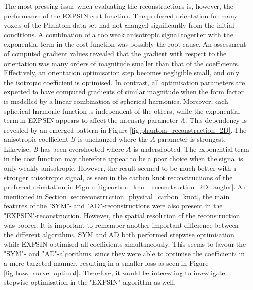 The most pressing issue when evaluating the reconstructions is, however, the performance of the EXPSIN cost function.
The preferred orientation for many voxels of the Phantom data set had not changed significantly from the initial conditions.
A combination of a too weak anisotropic signal together with the exponential term in the cost function was possibly the root cause.
An assessment of computed gradient values revealed that the gradient with respect to the orientation was many orders of magnitude smaller than that of the coefficients.
Effectively, an orientation optimisation step becomes negligible small, and only the isotropic coefficient is optimised.
In contrast, all optimisation parameters are expected to have computed gradients of similar magnitude when the form factor is modelled by a linear combination of spherical harmonics.
Moreover, each spherical harmonic function is independent of the others, while the exponential term in EXPSIN appears to affect the intensity parameter $A$.
This dependency is revealed by an emerged pattern in Figure \ref{fig:phantom_reconstruction_2D}. The anisotropic coefficient $B$ is unchanged where the $A$-parameter is strongest. Likewise, $B$ has been overshooted where $A$ is undershooted.
The exponential term in the cost function may therefore appear to be a poor choice when the signal is only weakly anisotropic.
However, the result seemed to be much better with a stronger anisotropic signal, as seen in the carbon knot reconstructions of the preferred orientation in Figure \ref{fig:carbon_knot_reconstruction_2D_angles}.
As mentioned in Section \ref{sec:reconstruction_physical_carbon_knot},
the main features of the "SYM"- and "AD"-reconstructions were also present in the "EXPSIN"-reconstruction.
However, the spatial resolution of the reconstruction was poorer.
It is important to remember another important difference between the different algorithms.
SYM and AD both performed stepwise optimisation, while EXPSIN optimised all coefficients simultaneously.
This seems to favour the "SYM"- and "AD"-algorithms, since they were able to optimise the coefficients in a more targeted manner, resulting in a smaller loss as seen in Figure \ref{fig:Loss_curve_optimal}.
Therefore, it would be interesting to investigate stepwise optimisation in the "EXPSIN"-algorithm as well.




